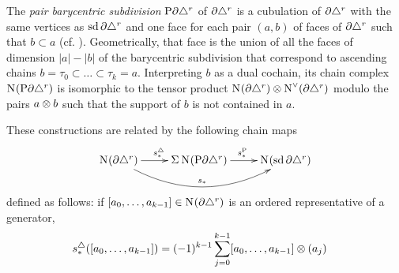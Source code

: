 The \emph{pair barycentric subdivision} ${\operatorname{P}} \partial\triangle^{r}$ of $\partial \triangle^{r}$ is a cubulation of $\partial \triangle^{r}$ with the same vertices as $\operatorname{sd} \partial \triangle^{r}$ and one face for each pair $(a,b)$ of faces of $\partial\triangle^{r}$ such that $b \subset a$ (cf. \cite{Rounds2010}). Geometrically, that face is the union of all the faces of dimension $|a|-|b|$ of the barycentric subdivision that correspond to ascending chains $b = \tau_0 \subset \dots \subset \tau_k= a$. Interpreting $b$ as a dual cochain, its chain complex $\operatorname{N}_{}({\operatorname{P}} \partial\triangle^{r})$ is isomorphic to the tensor product $\operatorname{N}_{}(\partial\triangle^{r}) \otimes \operatorname{N}^\vee_{}(\partial\triangle^{r})$ modulo the pairs $a \otimes b$ such that the support of $b$ is not contained in $a$.

These constructions are related by the following chain maps
\[
	\xymatrix{
	\chains(\partial\simplex^{r})\ar[r]^{s_*^{\simplex}}\ar@/_2.0pc/[rr]^{s_*} & \susp{}\chains(\Psd \partial\simplex^{r})\ar[r]^{s^{\Psd}_*} & \chains(\sd\partial\simplex^{r})
}
\]
defined as follows: if $[a_0,\dots,a_{k-1}]\in \operatorname{N}_{}(\partial\triangle^{r})$ is an ordered representative of a generator,
	\begin{align*}
	s_*^{\triangle}([a_0,\dots,a_{k-1}]) &= (-1)^{k-1}\sum_{j=0}^{k-1} [a_0,\dots,a_{k-1}]\otimes (a_j)
	\end{align*}

